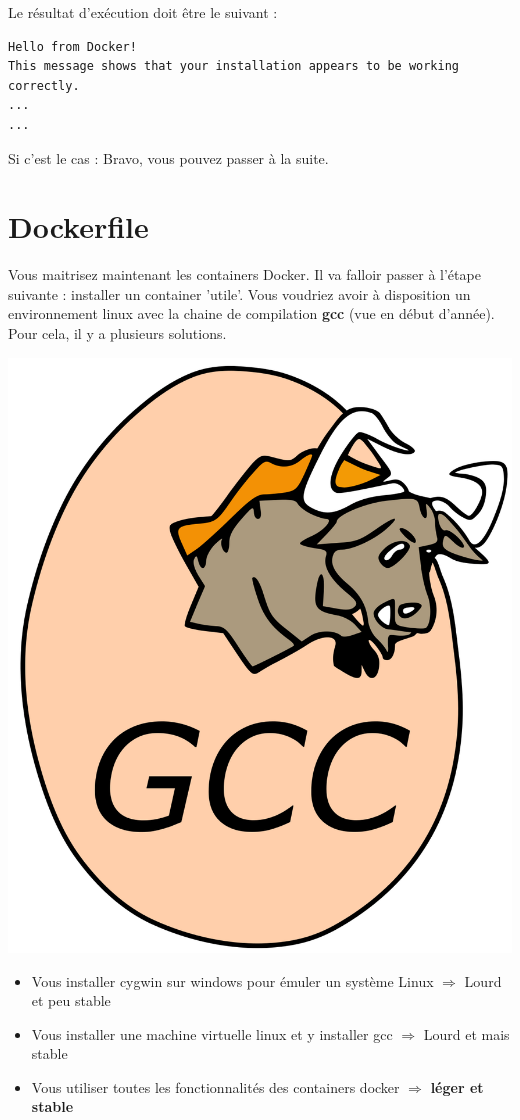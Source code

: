 \documentclass[french, 12pt]{article}%
\newcommand{\itemE}{\item[$\bullet$]}
\begin{document}
Le résultat d'exécution doit être le suivant :  

\begin{lstlisting}
Hello from Docker!
This message shows that your installation appears to be working correctly.
...
...
\end{lstlisting}

Si c'est le cas : Bravo, vous pouvez passer à la suite.


\section{Dockerfile}




\begin{minipage}{0.6\linewidth}
Vous maitrisez maintenant les containers Docker. Il va falloir passer à l'étape suivante : installer un container 'utile'. Vous voudriez avoir à disposition un environnement linux avec la chaine de compilation \textbf{gcc} (vue en début d'année). Pour cela, il y a plusieurs solutions.  

\end{minipage}
\begin{minipage}{0.39\linewidth}
\begin{center}
\includegraphics[scale=0.05]{./ressource/gcc}
\end{center}
\end{minipage}
\begin{itemize}
\itemE Vous installer cygwin sur windows pour émuler un système Linux $\Rightarrow$ Lourd et peu stable
\itemE Vous installer une machine virtuelle linux et y installer gcc  $\Rightarrow$ Lourd et mais stable
\itemE Vous utiliser toutes les fonctionnalités des containers docker $\Rightarrow$ \textbf{léger et stable}
\end{itemize}
\end{document}
